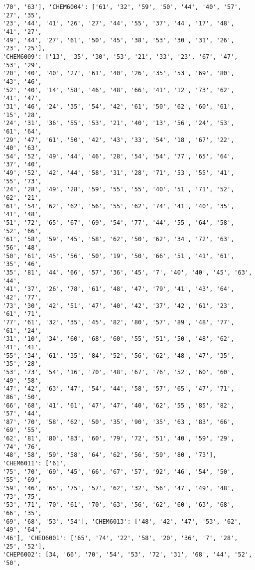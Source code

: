 \documentclass[11pt]{article}
\begin{document}
\begin{Verbatim}[commandchars=\\\{\}]
'70', '63'], 'CHEM6004': ['61', '32', '59', '50', '44', '40', '57', '27', '35',
'23', '44', '41', '26', '27', '44', '55', '37', '44', '17', '48', '41', '27',
'49', '44', '27', '61', '50', '45', '38', '53', '30', '31', '26', '23', '25'],
'CHEM6009': ['13', '35', '30', '53', '21', '33', '23', '67', '47', '53', '29',
'20', '40', '40', '27', '61', '40', '26', '35', '53', '69', '80', '43', '46',
'52', '40', '14', '58', '46', '48', '66', '41', '12', '73', '62', '41', '47',
'31', '46', '24', '35', '54', '42', '61', '50', '62', '60', '61', '15', '28',
'24', '31', '36', '55', '53', '21', '40', '13', '56', '24', '53', '61', '64',
'29', '47', '61', '50', '42', '43', '33', '54', '18', '67', '22', '40', '63',
'54', '52', '49', '44', '46', '28', '54', '54', '77', '65', '64', '37', '40',
'49', '52', '42', '44', '58', '31', '28', '71', '53', '55', '41', '55', '73',
'24', '28', '49', '28', '59', '55', '55', '40', '51', '71', '52', '62', '21',
'61', '54', '62', '62', '56', '55', '62', '74', '41', '40', '35', '41', '48',
'51', '72', '65', '67', '69', '54', '77', '44', '55', '64', '58', '52', '66',
'61', '58', '59', '45', '58', '62', '50', '62', '34', '72', '63', '56', '48',
'50', '61', '45', '56', '50', '19', '50', '66', '51', '41', '61', '35', '46',
'35', '81', '44', '66', '57', '36', '45', '7', '40', '40', '45', '63', '44',
'41', '37', '26', '78', '61', '48', '47', '79', '41', '43', '64', '42', '77',
'73', '30', '42', '51', '47', '40', '42', '37', '42', '61', '23', '61', '71',
'77', '61', '32', '35', '45', '82', '80', '57', '89', '48', '77', '61', '24',
'31', '10', '34', '60', '68', '60', '55', '51', '50', '48', '62', '41', '41',
'55', '34', '61', '35', '84', '52', '56', '62', '48', '47', '35', '35', '28',
'53', '73', '54', '16', '70', '48', '67', '76', '52', '60', '60', '49', '58',
'47', '42', '63', '47', '54', '44', '58', '57', '65', '47', '71', '86', '50',
'66', '68', '41', '61', '47', '47', '40', '62', '55', '85', '82', '57', '44',
'87', '70', '58', '62', '50', '35', '90', '35', '63', '83', '66', '69', '55',
'62', '81', '80', '83', '60', '79', '72', '51', '40', '59', '29', '74', '76',
'48', '58', '59', '58', '64', '62', '56', '59', '80', '73'], 'CHEM6011': ['61',
'75', '70', '69', '45', '66', '67', '57', '92', '46', '54', '50', '55', '69',
'59', '46', '65', '75', '57', '62', '32', '56', '47', '49', '48', '73', '75',
'53', '71', '70', '61', '70', '63', '56', '62', '60', '63', '68', '66', '35',
'69', '68', '53', '54'], 'CHEM6013': ['48', '42', '47', '53', '62', '49', '64',
'46'], 'CHEO6001': ['65', '74', '22', '58', '20', '36', '7', '28', '25', '52'],
'CHEP6002': [34, '66', '70', '54', '53', '72', '31', '68', '44', '52', '50',

\end{Verbatim}
\end{document}
